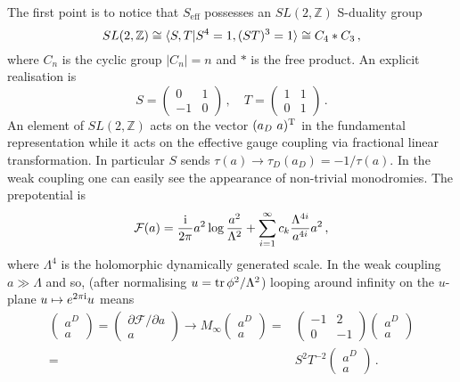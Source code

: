 \documentclass[main.tex]{subfiles}
\begin{document}
The first point is to notice that $S_{\text{eff}}$ possesses an $SL(2,\mathbb{Z})$ S-duality group 
\begin{equation}
SL(2,\mathbb{Z})\cong\langle S,T|S^4=1,(ST)^3=1\rangle\cong C_4\ast C_3\,,
\end{equation}
where $C_n$ is the cyclic group $|C_n|=n$ and $\ast$ is the free product.  An explicit realisation is
\begin{equation}
S=\begin{pmatrix}
0&1\\-1&0
\end{pmatrix}\,,\quad T=\begin{pmatrix}
1&1\\0&1
\end{pmatrix}\,.
\end{equation}
An element of $SL(2,\mathbb{Z})$ acts on the vector $(a_D\,\, a)^{\operatorname{T}}$ in the fundamental representation while it acts on the effective gauge coupling via fractional linear transformation.  In particular $S$ sends $\tau(a)\to\tau_D(a_D)=-1/\tau(a)$.  In the weak coupling one can easily see the appearance of non-trivial monodromies.  The prepotential is \cite{1988PhLB..206...75S} 
\begin{equation}
\mathcal{F}(a)=\frac{\mathrm{i}}{2\pi}a^2\log\frac{a^2}{\Lambda^2}+\sum_{i=1}^{\infty}c_k\frac{\Lambda^{4i}}{a^{4i}}a^2\,,
\end{equation}
where $\Lambda^4$ is the holomorphic dynamically generated scale.  In the weak coupling $a\gg\Lambda$ and so, (after normalising $u=\operatorname{tr}\phi^2/\Lambda^2$) looping around infinity on the $u$-plane $u\mapsto e^{2\pi\mathrm{i}}u$ means
\begin{equation}
\begin{aligned}
\begin{pmatrix}
a^D\\a
\end{pmatrix}=\begin{pmatrix}
\partial\mathcal{F}/{\partial a}\\a
\end{pmatrix}\to M_{\infty}\begin{pmatrix}
a^D\\a
\end{pmatrix}=&\begin{pmatrix}
-1&2\\0&-1
\end{pmatrix}\begin{pmatrix}
a^D\\a
\end{pmatrix}\\
=&S^2T^{-2}\begin{pmatrix}
a^D\\a
\end{pmatrix}\,.
\end{aligned}
\end{equation}
\end{document}
